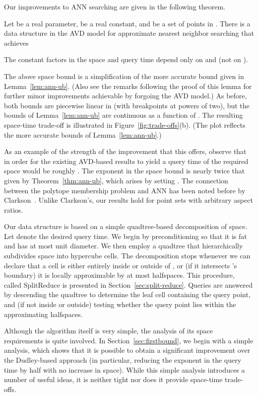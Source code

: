 \documentclass[11pt]{article}   \usepackage[letterpaper,hmargin=2.1cm,vmargin=3cm]{geometry}
\newcommand{\alg}{\textrm{SplitReduce}}
\begin{document}
Our improvements to ANN searching are given in the following theorem.

\begin{theorem} \label{thm:ann-ub}
Let  be a real parameter,  be a real constant, and  be a set of  points in . There is a data structure in the AVD model for approximate nearest neighbor searching that achieves

The constant factors in the space and query time depend only on  and  (not on ). 
\end{theorem}


The above space bound is a simplification of the more accurate bound given in Lemma~\ref{lem:ann-ub}. (Also see the remarks following the proof of this lemma for further minor improvements achievable by forgoing the AVD model.) As before, both bounds are piecewise linear in  (with breakpoints at powers of two), but the bounds of Lemma~\ref{lem:ann-ub} are continuous as a function of . The resulting space-time trade-off is illustrated in Figure~\ref{fig:trade-offs}(b). (The plot reflects the more accurate bounds of Lemma~\ref{lem:ann-ub}.)

As an example of the strength of the improvement that this offers, observe that in order for the existing AVD-based results to yield a query time of  the required space would be roughly . The exponent in the space bound is nearly twice that given by Theorem~\ref{thm:ann-ub}, which arises by setting . The connection between the polytope membership problem and ANN has been noted before by Clarkson~\cite{Clarkson-ANN}. Unlike Clarkson's, our results hold for point sets with arbitrary aspect ratios.



\medskip

Our data structure is based on a simple quadtree-based decomposition of space. Let  denote the desired query time. We begin by preconditioning  so that it is fat and has at most unit diameter. We then employ a quadtree that hierarchically subdivides space into hypercube cells. The decomposition stops whenever we can declare that a cell is either entirely inside or outside of , or (if it intersects 's boundary) it is locally approximable by at most  halfspaces. This procedure, called {\alg} is presented in Section~\ref{sec:split-reduce}. Queries are answered by descending the quadtree to determine the leaf cell containing the query point, and (if not inside or outside) testing whether the query point lies within the approximating halfspaces. 

Although the algorithm itself is very simple, the analysis of its space requirements is quite involved. In Section~\ref{sec:firstbound}, we begin with a simple analysis, which shows that it is possible to obtain a significant improvement over the Dudley-based approach (in particular, reducing the exponent in the query time by  half with no increase in space). While this simple analysis introduces a number of useful ideas, it is neither tight nor does it provide space-time trade-offs. 
\end{document}
